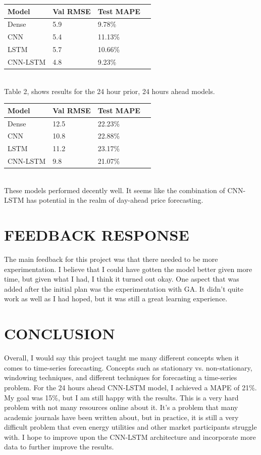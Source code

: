 \documentclass[9pt,a4paper,twoside]{rho}
\begin{document}
	\begin{tabular}{lllp{12.2cm}}
		\toprule
		\textbf{Model} & \textbf{Val RMSE} & \textbf{Test MAPE} \\                                            
		\midrule
		Dense & 5.9 & 9.78\% \\
		CNN & 5.4 & 11.13\% \\
		LSTM & 5.7 & 10.66\% \\
		CNN-LSTM & 4.8 & 9.23\% \\
		\bottomrule
	\end{tabular}\\
	
\noindent Table 2, shows results for the 24 hour prior, 24 hours ahead models. 

	\begin{tabular}{lllp{12.2cm}}
		\toprule
		\textbf{Model} & \textbf{Val RMSE} & \textbf{Test MAPE} \\                                            
		\midrule
		Dense & 12.5 & 22.23\% \\
		CNN & 10.8 & 22.88\% \\
		LSTM & 11.2 & 23.17\% \\
		CNN-LSTM & 9.8 & 21.07\% \\
		\bottomrule
	\end{tabular}\\
	

\noindent These models performed decently well. It seems like the combination of CNN-LSTM has potential in the realm of day-ahead price forecasting.

\section*{FEEDBACK RESPONSE}
The main feedback for this project was that there needed to be more experimentation. I believe that I could have gotten the model better given more time, but given what I had, I think it turned out okay. One aspect that was added after the initial plan was the experimentation with GA. It didn't quite work as well as I had hoped, but it was still a great learning experience.

\section*{CONCLUSION}

Overall, I would say this project taught me many different concepts when it comes to time-series forecasting. Concepts such as stationary vs. non-stationary, windowing techniques, and different techniques for forecasting a time-series problem. For the 24 hours ahead CNN-LSTM model, I achieved a MAPE of 21\%. My goal was 15\%, but I am still happy with the results. This is a very hard problem with not many resources online about it. It's a problem that many academic journals have been written about, but in practice, it is still a very difficult problem that even energy utilities and other market participants struggle with. I hope to improve upon the CNN-LSTM architecture and incorporate more data to further improve the results. 
\end{document}
